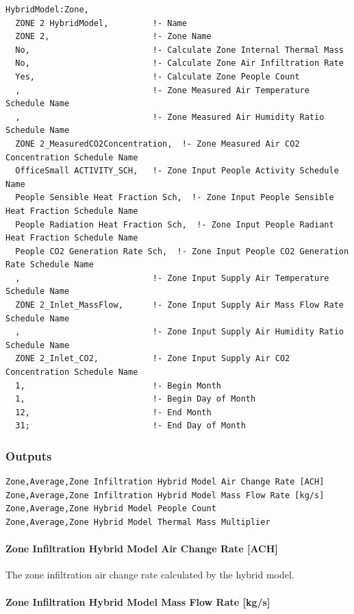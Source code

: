 \begin{lstlisting}
HybridModel:Zone,
  ZONE 2 HybridModel,         !- Name
  ZONE 2,                     !- Zone Name
  No,                         !- Calculate Zone Internal Thermal Mass
  No,                         !- Calculate Zone Air Infiltration Rate
  Yes,                        !- Calculate Zone People Count
  ,                           !- Zone Measured Air Temperature Schedule Name
  ,                           !- Zone Measured Air Humidity Ratio Schedule Name
  ZONE 2_MeasuredCO2Concentration,  !- Zone Measured Air CO2 Concentration Schedule Name
  OfficeSmall ACTIVITY_SCH,   !- Zone Input People Activity Schedule Name
  People Sensible Heat Fraction Sch,  !- Zone Input People Sensible Heat Fraction Schedule Name
  People Radiation Heat Fraction Sch,  !- Zone Input People Radiant Heat Fraction Schedule Name
  People CO2 Generation Rate Sch,  !- Zone Input People CO2 Generation Rate Schedule Name
  ,                           !- Zone Input Supply Air Temperature Schedule Name
  ZONE 2_Inlet_MassFlow,      !- Zone Input Supply Air Mass Flow Rate Schedule Name
  ,                           !- Zone Input Supply Air Humidity Ratio Schedule Name
  ZONE 2_Inlet_CO2,           !- Zone Input Supply Air CO2 Concentration Schedule Name
  1,                          !- Begin Month
  1,                          !- Begin Day of Month
  12,                         !- End Month
  31;                         !- End Day of Month
\end{lstlisting}


\subsubsection{Outputs}\label{outputs-030}

\begin{lstlisting}
Zone,Average,Zone Infiltration Hybrid Model Air Change Rate [ACH]
Zone,Average,Zone Infiltration Hybrid Model Mass Flow Rate [kg/s]
Zone,Average,Zone Hybrid Model People Count
Zone,Average,Zone Hybrid Model Thermal Mass Multiplier
\end{lstlisting}

\paragraph{Zone Infiltration Hybrid Model Air Change Rate {[}ACH{]}}\label{zone-infiltration-hybrid-model-air-change-rate}

The zone infiltration air change rate calculated by the hybrid model.

\paragraph{Zone Infiltration Hybrid Model Mass Flow Rate {[}kg/s{]}}\label{zone-infiltration-hybrid-model-air-mass-flow-rate}

